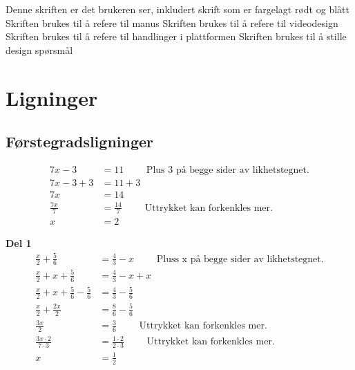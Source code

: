 \documentclass[12pt,twoside,onecolumn]{article}
\begin{document}
\hspace{-6mm}Denne skriften er det brukeren ser, inkludert skrift som er fargelagt {\color{red}rødt} og {\color{blue}blått}\newline
{\color{gray} Skriften brukes til å refere til manus} \newline
{\color{PineGreen} Skriften brukes til å refere til videodesign} \newline
{\color{Maroon} Skriften brukes til å refere til handlinger i plattformen} \newline
{\color{Cerulean} Skriften brukes til å stille design spørsmål}

\section*{Ligninger}

\subsection*{Førstegradsligninger}

\begin{Exercise}
\begin{align}
7x - 3 &= 11  \qquad\text{ Plus 3 på begge sider av likhetstegnet.}\\
7x -3 +3 &= 11 + 3\\
7x &= 14\\  
\frac{7x}{7} &=  \frac{14}{7} \qquad\text{ Uttrykket kan forkenkles mer.}\\
x &= 2
\end{align}
\end{Exercise}

\begin{Exercise}
\textbf{Del 1}
\begin{align}
\frac{x}{2} + \frac{5}{6} &=  \frac{4}{3} - x \qquad\text{ Pluss x på begge sider av likhetstegnet.}\\
\frac{x}{2} + x + \frac{5}{6} &=  \frac{4}{3} - x + x\\
\frac{x}{2} + x + \frac{5}{6} - \frac{5}{6} &=  \frac{4}{3} - \frac{5}{6}\\
\frac{x}{2} + \frac{2x}{2} &= \frac{8}{6} - \frac{5}{6}\\
\frac{3x}{2}  &= \frac{3}{6} \qquad\text{ Uttrykket kan forkenkles mer.}\\ 
\frac{3x\cdot2}{7\cdot3} &=  \frac{1\cdot2}{2\cdot3} \qquad\text{ Uttrykket kan forkenkles mer.}\\
x &= \frac{1}{2}
\end{align}
\end{Exercise}
\end{document}

